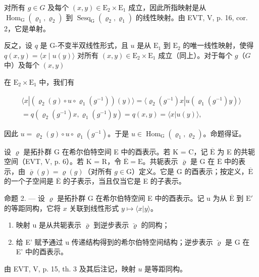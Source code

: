 对所有 \(g \in G\) 及每个 \((x, y) \in \mathrm{E}_{2} \times \mathrm{E}_{1}\) 成立，因此所指映射是从 \(\operatorname{Hom}_{\mathrm{G}}(\varrho_{1}, \varrho_{2})\) 到 \(\operatorname{Sesq}_{\mathrm{G}}(\varrho_{2}, \varrho_{1})\) 的线性映射。由 EVT, V, p. 16, cor. 2，它是单射。

反之，设 \(q\) 是 G-不变半双线性形式，且 \(u\) 是从 \(\mathrm{E}_1\) 到 \(\mathrm{E}_2\) 的唯一线性映射，使得 \(q(x,y) = \langle x \mid u(y) \rangle\) 对所有 \((x,y) \in \mathrm{E}_2 \times \mathrm{E}_1\) 成立（同上）。对于每个 \(g\)（\(G\) 中）及每个 \((x,y)\)

在 \(\mathrm{E}_2\times \mathrm{E}_1\) 中，我们有

\[
\begin{array}{c} \langle x | (\varrho_ {2} (g) \circ u \circ \varrho_ {1} (g ^ {- 1})) (y) \rangle = \langle \varrho_ {2} (g ^ {- 1}) x | u (\varrho_ {1} (g ^ {- 1}) y) \rangle \\ = q (\varrho_ {2} (g ^ {- 1}) x, \varrho_ {1} (g ^ {- 1}) y) = q (x, y) = \langle x | u (y) \rangle , \end{array}
\]

因此 \(u = \varrho_{2}(g) \circ u \circ \varrho_{1}(g^{-1})\)。于是 \(u \in \operatorname{Hom}_{\mathrm{G}}(\varrho_{1}, \varrho_{2})\)。命题得证。

设 \(\varrho\) 是拓扑群 G 在希尔伯特空间 E 中的酉表示。若 K = C，记 \(\overline{\mathrm{E}}\) 为 E 的共轭空间（EVT, V, p. 6）。若 K = R，令 \(\overline{\mathrm{E}} = \mathrm{E}\)。共轭表示 \(\overline{\varrho}\) 是 G 在 \(\overline{\mathrm{E}}\) 中的表示，由 \(\overline{\varrho}(g) = \varrho(g)\)（对所有 \(g \in \mathrm{G}\)）定义。它是 G 的酉表示；按定义，\(\overline{\mathrm{E}}\) 的一个子空间是 \(\overline{\mathrm{E}}\) 的子表示，当且仅当它是 E 的子表示。

命题 2. --- 设 \(\varrho\) 是拓扑群 G 在希尔伯特空间 E 中的酉表示。记 u 为从 \(\overline{\mathrm{E}}\) 到 \(\mathrm{E}'\) 的等距同构，它将 \(x\) 关联到线性形式 \(y\mapsto \langle x|y\rangle\)。

\begin{enumerate}
\def\labelenumi{\alph{enumi})}
\item
  映射 u 是从共轭表示 \(\overline{\varrho}\) 到逆步表示 \(\breve{\varrho}\) 的同构；
\item
  给 E' 赋予通过 u 传递结构得到的希尔伯特空间结构；逆步表示 \(\breve{\varrho}\) 是 G 在 E' 中的酉表示。
\end{enumerate}

由 EVT, V, p. 15, th. 3 及其后注记，映射 \(u\) 是等距同构。

